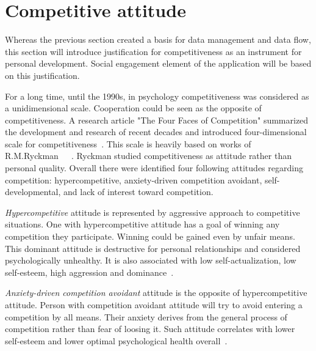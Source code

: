 
\section{Competitive attitude}\label{sec:competitive-attitude}



Whereas the previous section created a basis for data management and data flow,
this section will introduce justification for competitiveness as an instrument for personal development.
Social engagement element of the application will be based on this justification.

For a long time, until the 1990s, in psychology competitiveness was considered as a unidimensional scale.
Cooperation could be seen as the opposite of competitiveness.
A research article "The Four Faces of Competition" summarized the development and research of recent decades
and introduced four-dimensional scale for competitiveness~\cite{the-four-faces-of-competetition}.
This scale is heavily based on works of R.M.Ryckman~\cite{cit-ryckman-hca}~\cite{cit-ryckman-adca}~\cite{cit-ryckman-pdca}.
Ryckman studied competitiveness as attitude rather than personal quality.
Overall there were identified four following attitudes regarding competition:
hypercompetitive, anxiety-driven competition avoidant, self-developmental, and lack of interest toward competition.

\textit{Hypercompetitive} attitude is represented by aggressive approach to competitive situations.
One with hypercompetitive attitude has a goal of winning any competition they participate.
Winning could be gained even by unfair means.
This dominant attitude is destructive for personal relationships and considered psychologically unhealthy.
It is also associated with low self-actualization, low self-esteem, high aggression and dominance~\cite{cit-ryckman-hca}.

\textit{Anxiety-driven competition avoidant} attitude is the opposite of hypercompetitive attitude.
Person with competition avoidant attitude will try to avoid entering a competition by all means.
Their anxiety derives from the general process of competition rather than fear of loosing it.
Such attitude correlates with lower self-esteem and lower optimal psychological health overall~\cite{cit-ryckman-adca}.

